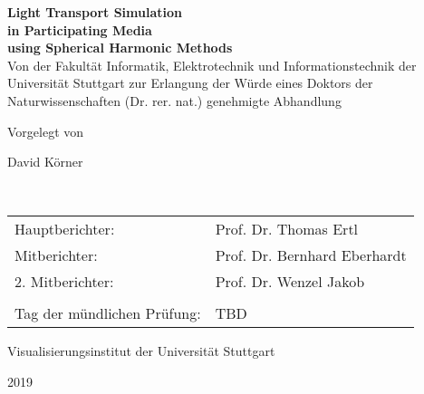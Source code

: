 \begin{titlepage}
 
\begin{center}
	\textbf{\huge Light Transport Simulation}\\ 
	\vspace{0.3cm}
	\textbf{\huge in Participating Media}\\ 
	\vspace{0.3cm}
	\textbf{\huge using Spherical Harmonic Methods}\\
	
	\vspace{1.5cm}	
	\large Von der Fakultät Informatik, Elektrotechnik und Informationstechnik der Universität Stuttgart zur Erlangung der Würde eines Doktors der Naturwissenschaften (Dr. rer. nat.) genehmigte Abhandlung
	
	\vspace{1.8cm}
	Vorgelegt von
	
	\vspace{0.2cm}
	\huge David Körner
	
	\vspace{0.2cm}
	\large \
	
	\vspace{1.8cm}	
	\begin{longtable}{l l}
	Hauptberichter: & Prof. Dr. Thomas Ertl \\
	Mitberichter: & Prof. Dr. Bernhard Eberhardt \\
	2. Mitberichter: & Prof. Dr. Wenzel Jakob\\
	& 	\\
	Tag der mündlichen Prüfung: & TBD
	\end{longtable}
		
	\vspace{1.5cm}
	Visualisierungsinstitut der Universität Stuttgart
	
	2019
\end{center}
\vspace{1cm}
\begin{flushright}
\end{flushright}
\end{titlepage}


